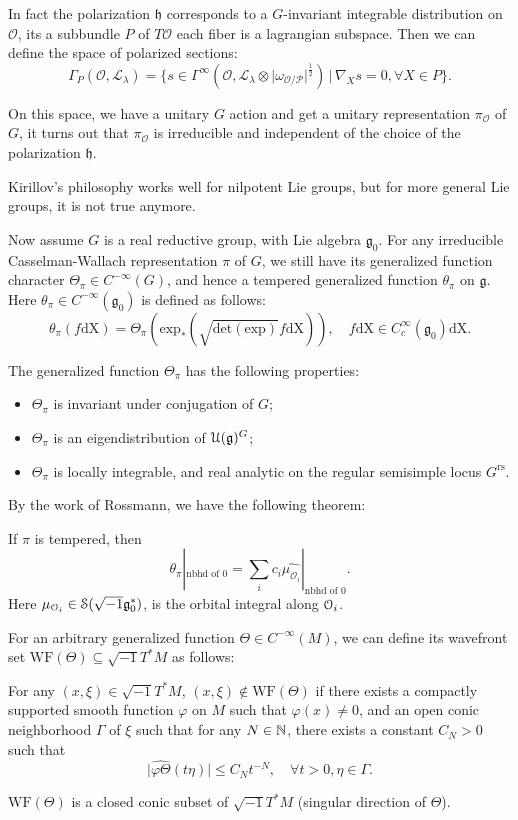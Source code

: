 \documentclass[12pt]{amsart}
\numberwithin{equation}{section}
\newcommand{\fg}{\mathfrak{g}} \newcommand{\fh}{\mathfrak{h}} \newcommand{\fk}{\mathfrak{k}}
\newcommand{\abs}[1]{\lvert#1\rvert}
\renewcommand{\hat}{\widehat}
\newcommand{\set}[2]{\{#1\,|\,#2\}}
\begin{document}
In fact the polarization $\mathfrak{h}$ corresponds to a $G$-invariant integrable distribution on $\mathcal{O}$, its a subbundle $P$ of $T\mathcal{O}$ each fiber is a lagrangian subspace. 
Then we can define the space of polarized sections:
\[\Gamma_P(\mathcal{O},\mathcal{L}_{\lambda}) = \set{s \in \Gamma^{\infty}(\mathcal{O},\mathcal{L}_{\lambda} \otimes \abs{\omega_{\mathcal{O/P}}}^{\frac{1}{2}})}{\nabla_X s = 0, \forall X \in P}.\]

On this space, we have a unitary $G$ action and get a unitary representation $\pi_{\mathcal{O}}$ of $G$, it turns out that $\pi_{\mathcal{O}}$ is irreducible and independent of the choice of the polarization $\mathfrak{h}$.

Kirillov's philosophy works well for nilpotent Lie groups, but for more general Lie groups, it is not true anymore.


Now assume $G$ is a real reductive group, with Lie algebra $\fg_0$. For any irreducible Casselman-Wallach representation $\pi$ of $G$, we still have its generalized function character $\Theta_\pi \in C^{-\infty}(G)$, and hence a tempered generalized function $\theta_\pi$ on $\fg$. Here $\theta_{\pi} \in C^{-\infty}(\fg_0)$ is defined as follows:
\[\theta_\pi(f\mathrm{dX}) = \Theta_\pi(\mathrm{exp}_{*}(\sqrt{\mathrm{det(exp)}}f\mathrm{dX})), \quad f\mathrm{dX} \in C_{c}^{\infty}(\fg_0)\mathrm{dX}.\]

The generalized function $\Theta_{\pi}$ has the following properties:
\begin{itemize}
    \item $\Theta_{\pi}$ is invariant under conjugation of $G$;
    \item $\Theta_{\pi}$ is an eigendistribution of $\CU(\fg)^{G}$;
    \item $\Theta_{\pi}$ is locally integrable, and real analytic on the regular semisimple locus $G^{\mathrm{rs}}$.
\end{itemize}

By the work of Rossmann, we have the following theorem:
\begin{thm}
    If $\pi$ is tempered, then
    \[
        \theta_{\pi}|_{\textrm{nbhd of 0}} = \sum_{i} c_i \hat{\mu_{\mathcal{O}_i}}|_{\textrm{nbhd of 0}}.
    \]
    Here $\mu_{\CO_i} \in \mathcal{S}(\sqrt{-1}\fg_0^*)$, is the orbital integral along ${\mathcal {O}}_i$.
\end{thm}

For an arbitrary generalized function $\Theta \in C^{-\infty}(M)$, we can define its wavefront set $\mathrm{WF}(\Theta) \subseteq \sqrt{-1}T^*M$ as follows:
\begin{defn}
    For any $(x,\xi) \in \sqrt{-1}T^*M$, $(x,\xi) \notin \mathrm{WF}(\Theta)$ if there exists a compactly supported smooth function $\varphi$ on $M$ such that $\varphi(x) \neq 0$, and an open conic neighborhood $\Gamma$ of $\xi$ such that for any $N \in {\mathbb {N}}$, there exists a constant $C_N > 0$ such that
    \[\abs{\hat{\varphi \Theta}(t\eta)} \leq C_N t^{-N}, \quad \forall t > 0, \eta \in \Gamma.\]
\end{defn}
$\mathrm{WF}(\Theta)$ is a closed conic subset of $\sqrt{-1}T^*M$ (singular direction of $\Theta$).
\end{document}
